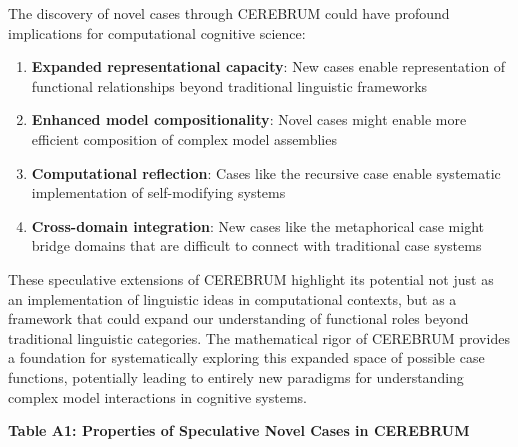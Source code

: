 \documentclass[
  11pt,
  letterpaper,
]{article}
\providecommand{\tightlist}{%
  \setlength{\itemsep}{0pt}\setlength{\parskip}{0pt}}
\begin{document}
The discovery of novel cases through CEREBRUM could have profound
implications for computational cognitive science:

\begin{enumerate}
\def\labelenumi{\arabic{enumi}.}
\tightlist
\item
  \textbf{Expanded representational capacity}: New cases enable
  representation of functional relationships beyond traditional
  linguistic frameworks
\item
  \textbf{Enhanced model compositionality}: Novel cases might enable
  more efficient composition of complex model assemblies
\item
  \textbf{Computational reflection}: Cases like the recursive case
  enable systematic implementation of self-modifying systems
\item
  \textbf{Cross-domain integration}: New cases like the metaphorical
  case might bridge domains that are difficult to connect with
  traditional case systems
\end{enumerate}

These speculative extensions of CEREBRUM highlight its potential not
just as an implementation of linguistic ideas in computational contexts,
but as a framework that could expand our understanding of functional
roles beyond traditional linguistic categories. The mathematical rigor
of CEREBRUM provides a foundation for systematically exploring this
expanded space of possible case functions, potentially leading to
entirely new paradigms for understanding complex model interactions in
cognitive systems.

\textbf{Table A1: Properties of Speculative Novel Cases in CEREBRUM}
\end{document}
